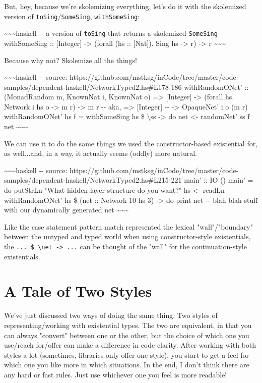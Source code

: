 \documentclass[]{article}
\begin{document}
But, hey, because we're skolemizing everything, let's do it with the skolemized
version of \texttt{toSing}/\texttt{SomeSing}, \texttt{withSomeSing}:

\textasciitilde{}\textasciitilde{}\textasciitilde{}haskell -\/- a version of
\texttt{toSing} that returns a skolemized \texttt{SomeSing} withSomeSing ::
{[}Integer{]} -\textgreater{} (forall (hs :: {[}Nat{]}). Sing hs -\textgreater{}
r) -\textgreater{} r \textasciitilde{}\textasciitilde{}\textasciitilde{}

Because why not? Skolemize all the things!

\textasciitilde{}\textasciitilde{}\textasciitilde{}haskell -\/- source:
https://github.com/mstksg/inCode/tree/master/code-samples/dependent-haskell/NetworkTyped2.hs\#L178-186
withRandomONet' :: (MonadRandom m, KnownNat i, KnownNat o) =\textgreater{}
{[}Integer{]} -\textgreater{} (forall hs. Network i hs o -\textgreater{} m r)
-\textgreater{} m r -\/- aka, =\textgreater{} {[}Integer{]} -\/- -\textgreater{}
OpaqueNet' i o (m r) withRandomONet' hs f = withSomeSing hs \$
\textbackslash{}ss -\textgreater{} do net \textless{}- randomNet' ss f net
\textasciitilde{}\textasciitilde{}\textasciitilde{}

We can use it to do the same things we used the constructor-based existential
for, as well...and, in a way, it actually seems (oddly) more natural.

\textasciitilde{}\textasciitilde{}\textasciitilde{}haskell -\/- source:
https://github.com/mstksg/inCode/tree/master/code-samples/dependent-haskell/NetworkTyped2.hs\#L215-221
main' :: IO () main' = do putStrLn "What hidden layer structure do you want?" hs
\textless{}- readLn withRandomONet' hs \$ (net :: Network 10 hs 3)
-\textgreater{} do print net -\/- blah blah stuff with our dynamically generated
net \textasciitilde{}\textasciitilde{}\textasciitilde{}

Like the case statement pattern match represented the lexical "wall"/"boundary"
between the untyped and typed world when using constructor-style existentials,
the \texttt{...\ \$\ \textbackslash{}net\ -\textgreater{}\ ...} can be thought
of the "wall" for the continuation-style existentials.

\section{A Tale of Two Styles}

We've just discussed two ways of doing the same thing. Two styles of
representing/working with existential types. The two are equivalent, in that you
can always "convert" between one or the other, but the choice of which one you
use/reach for/offer can make a difference in code clarity. After working with
both styles a lot (sometimes, libraries only offer one style), you start to get
a feel for which one you like more in which situations. In the end, I don't
think there are any hard or fast rules. Just use whichever one you feel is more
readable!
\end{document}
